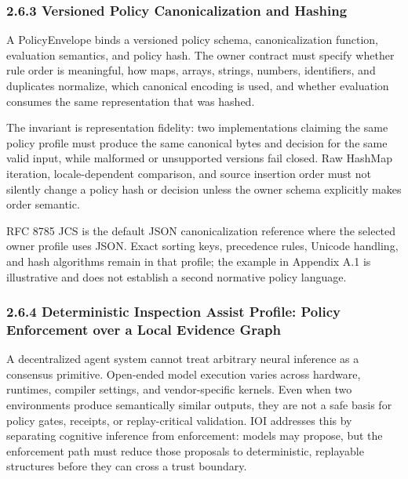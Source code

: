 \documentclass[
  11pt,
]{article}
\begin{document}
\hypertarget{canonical-policy-ordering-hashing-normative}{%
\subsubsection{2.6.3 Versioned Policy Canonicalization and
Hashing}\label{canonical-policy-ordering-hashing-normative}}

A PolicyEnvelope binds a versioned policy schema, canonicalization function,
evaluation semantics, and policy hash. The owner contract must specify whether
rule order is meaningful, how maps, arrays, strings, numbers, identifiers, and
duplicates normalize, which canonical encoding is used, and whether evaluation
consumes the same representation that was hashed.

The invariant is representation fidelity: two implementations claiming the
same policy profile must produce the same canonical bytes and decision for the
same valid input, while malformed or unsupported versions fail closed. Raw
HashMap iteration, locale-dependent comparison, and source insertion order
must not silently change a policy hash or decision unless the owner schema
explicitly makes order semantic.

RFC 8785 JCS is the default JSON canonicalization reference where the selected
owner profile uses JSON. Exact sorting keys, precedence rules, Unicode handling,
and hash algorithms remain in that profile; the example in Appendix A.1 is
illustrative and does not establish a second normative policy language.
\hypertarget{deterministic-inspection-assist-profile-policy-enforcement-over-a-local-evidence-graph}{%
\subsubsection{2.6.4 Deterministic Inspection Assist Profile: Policy Enforcement
over a Local Evidence
Graph}\label{deterministic-inspection-assist-profile-policy-enforcement-over-a-local-evidence-graph}}

A decentralized agent system cannot treat arbitrary neural inference as
a consensus primitive. Open-ended model execution varies across
hardware, runtimes, compiler settings, and vendor-specific kernels. Even
when two environments produce semantically similar outputs, they are not
a safe basis for policy gates, receipts, or replay-critical validation.
IOI addresses this by separating cognitive inference from enforcement:
models may propose, but the enforcement path must reduce those proposals
to deterministic, replayable structures before they can cross a trust
boundary.
\end{document}
